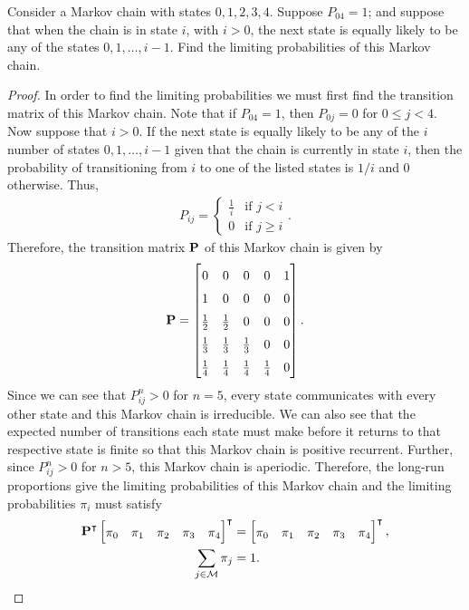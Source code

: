 \begin{problem}{4.35}
  Consider a Markov chain with states $0, 1, 2, 3, 4$. Suppose $P_{04} = 1$; and suppose
  that when the chain is in state $i$, with $i > 0$, the next state is equally
  likely to be any of the states $0, 1, \dots, i-1$. Find the limiting probabilities of
  this Markov chain.
\end{problem}

\begin{proof}
  In order to find the limiting probabilities we must first find the transition
  matrix of this Markov chain. Note that if $P_{04} = 1$, then $P_{0j} = 0$ for $0 \leq j < 4$.
  Now suppose that $i > 0$. If the next state is equally likely to be any of the $i$ number of states
  $0, 1, \dots, i-1$ given that the chain is currently in state $i$, then the probability of transitioning from $i$ to one of the listed states
  is $1/i$ and 0 otherwise. Thus,
  \begin{align*}
    P_{ij} =
    \begin{cases}
      \frac{1}{i} & \text{if $j < i$} \\
      0 & \text{if $j \geq i$}
    \end{cases}.
  \end{align*}
  Therefore, the transition matrix $\bold{P}$ of this Markov chain is given by
  \begin{align*}
    \bold{P} =
    \renewcommand\arraystretch{1.5}
    \begin{bmatrix}
      0           & 0           & 0           & 0           & 1 \\
      1           & 0           & 0           & 0           & 0 \\
      \frac{1}{2} & \frac{1}{2} & 0           & 0           & 0 \\
      \frac{1}{3} & \frac{1}{3} & \frac{1}{3} & 0           & 0 \\
      \frac{1}{4} & \frac{1}{4} & \frac{1}{4} & \frac{1}{4} & 0 \\
    \end{bmatrix}.
  \end{align*}
  Since we can see that $P_{ij}^n > 0$ for $n=5$, every state communicates with every other state and
  this Markov chain is irreducible. We can also see that the expected number
  of transitions each state must make before it returns to that respective state
  is finite so that this Markov chain is positive recurrent. Further, since
  $P_{ij}^n > 0$ for $n>5$, this Markov chain is aperiodic.
  Therefore, the long-run proportions give the limiting probabilities of this
  Markov chain and the limiting probabilities $\pi_i$ must satisfy
    \begin{align*}
     \bold{P}^\intercal
     \begin{bmatrix} \pi_0 & \pi_1 & \pi_2 & \pi_3 & \pi_4\end{bmatrix}^\intercal &= \begin{bmatrix} \pi_0 & \pi_1 & \pi_2 & \pi_3 & \pi_4\end{bmatrix}^\intercal,\\
     \sum_{j\in \mathcal{M}} \pi_j &= 1.
  \end{align*}


\end{proof}
